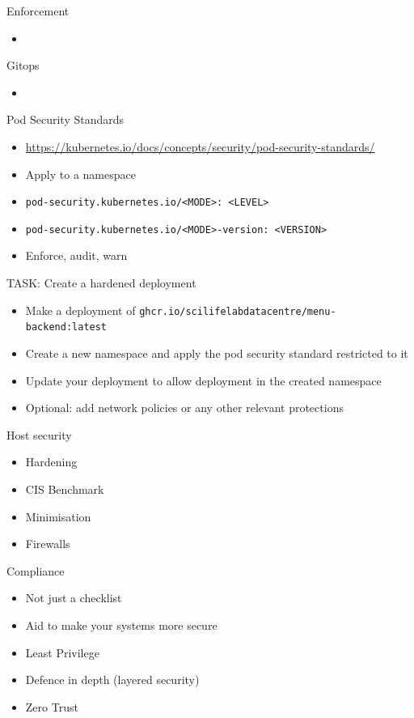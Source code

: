 \documentclass{dcpresentation}
\begin{document}

\begin{frame}{Enforcement}
  \begin{itemize}
    \item 
  \end{itemize}
\end{frame}

\begin{frame}{Gitops}
  \begin{itemize}
    \item 
  \end{itemize}
\end{frame}

\begin{frame}{Pod Security Standards}
  \begin{itemize}
  \item \url{https://kubernetes.io/docs/concepts/security/pod-security-standards/}
  \item Apply to a namespace
  \item \texttt{pod-security.kubernetes.io/<MODE>: <LEVEL>}
  \item \texttt{pod-security.kubernetes.io/<MODE>-version: <VERSION>}
  \item Enforce, audit, warn
  \end{itemize}
\end{frame}

\begin{frame}{TASK: Create a hardened deployment}
  \begin{itemize}
  \item Make a deployment of \texttt{ghcr.io/scilifelabdatacentre/menu-backend:latest}
  \item Create a new namespace and apply the pod security standard restricted to it
  \item Update your deployment to allow deployment in the created namespace
  \item Optional: add network policies or any other relevant protections
  \end{itemize}
\end{frame}


\begin{frame}{Host security}
  \begin{itemize}
  \item Hardening
  \item CIS Benchmark
  \item Minimisation
  \item Firewalls
  \end{itemize}
\end{frame}


\begin{frame}{Compliance}
  \begin{itemize}
  \item Not just a checklist
  \item Aid to make your systems more secure 
  \end{itemize}
\end{frame}

\begin{frame}
  \begin{itemize}
  \item Least Privilege
  \item Defence in depth (layered security)
  \item Zero Trust
  \end{itemize}
\end{frame}
\end{document}
